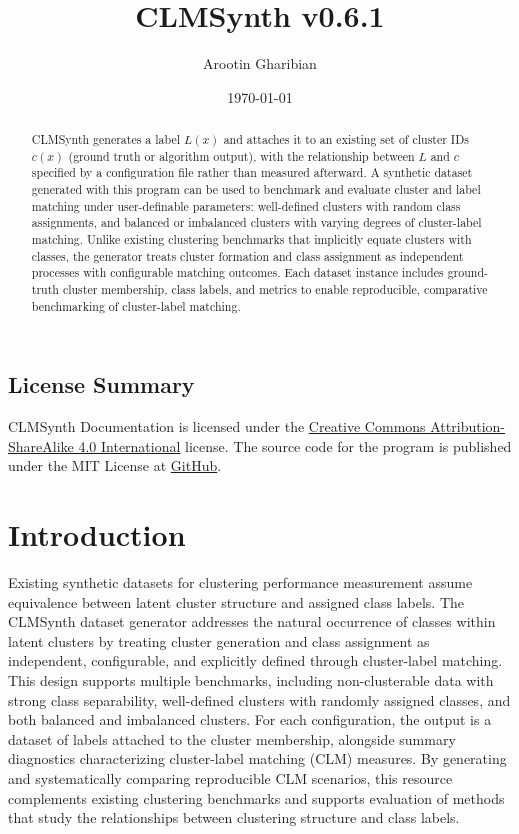 \documentclass[a4paper,12pt]{article}
\title{CLMSynth v0.6.1}
\author{Arootin Gharibian}
\date{\today}
\begin{document}
\maketitle

\begin{abstract}
CLMSynth generates a label $L(x)$ and attaches it to an existing set of cluster IDs $c(x)$ (ground truth or algorithm output), with the relationship between $L$ and $c$ specified by a configuration file rather than measured afterward. A synthetic dataset generated with this program can be used to benchmark and evaluate cluster and label matching under user-definable parameters: well-defined clusters with random class assignments, and balanced or imbalanced clusters with varying degrees of cluster-label matching. Unlike existing clustering benchmarks that implicitly equate clusters with classes, the generator treats cluster formation and class assignment as independent processes with configurable matching outcomes. Each dataset instance includes ground-truth cluster membership, class labels, and metrics to enable reproducible, comparative benchmarking of cluster-label matching.

\end{abstract}

\subsection*{License Summary}
CLMSynth Documentation is licensed under the \href{https://creativecommons.org/licenses/by-sa/4.0/}{Creative Commons Attribution-ShareAlike 4.0 International} license. The source code for the program is published under the MIT License at \href{https://github.com/A-Gharibian/CLMSynth}{GitHub}.

\newpage
\section{Introduction}
Existing synthetic datasets for clustering performance measurement assume equivalence between latent cluster structure and assigned class labels. The CLMSynth dataset generator addresses the natural occurrence of classes within latent clusters by treating cluster generation and class assignment as independent, configurable, and explicitly defined through cluster-label matching. This design supports multiple benchmarks, including non-clusterable data with strong class separability, well-defined clusters with randomly assigned classes, and both balanced and imbalanced clusters. For each configuration, the output is a dataset of labels attached to the cluster membership, alongside summary diagnostics characterizing cluster-label matching (CLM) measures. By generating and systematically comparing reproducible CLM scenarios, this resource complements existing clustering benchmarks and supports evaluation of methods that study the relationships between clustering structure and class labels.
\end{document}
